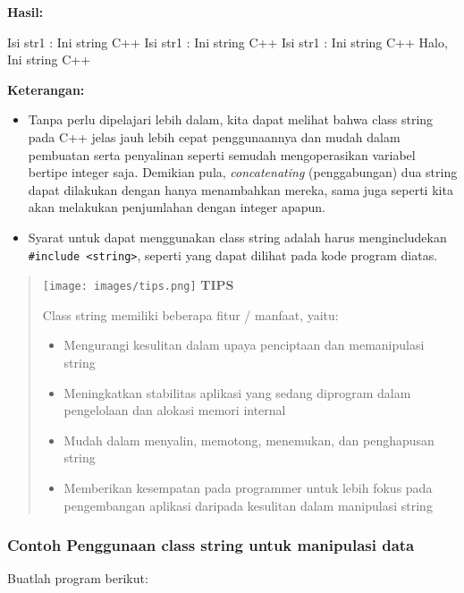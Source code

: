 \textbf{Hasil:}

\begin{lcverbatim}
Isi str1 : Ini string C++
Isi str1 : Ini string C++
Isi str1 : Ini string C++
Halo, Ini string C++
\end{lcverbatim}

\textbf{Keterangan:}

\begin{itemize}

\item
  Tanpa perlu dipelajari lebih dalam, kita dapat melihat bahwa class
  string pada C++ jelas jauh lebih cepat penggunaannya dan mudah dalam
  pembuatan serta penyalinan seperti semudah mengoperasikan variabel
  bertipe integer saja. Demikian pula, \emph{concatenating}
  (penggabungan) dua string dapat dilakukan dengan hanya menambahkan
  mereka, sama juga seperti kita akan melakukan penjumlahan dengan
  integer apapun.
\item
  Syarat untuk dapat menggunakan class string adalah harus
  mengincludekan \texttt{\#include\ \textless{}string\textgreater{}},
  seperti yang dapat dilihat pada kode program diatas.
\end{itemize}
\begin{quotation}
\texttt{[image: images/tips.png]}	 \textbf{TIPS} 
	 
	 Class
	 string memiliki beberapa fitur / manfaat, yaitu: 
\begin{itemize}
	\item Mengurangi kesulitan dalam upaya penciptaan dan
	memanipulasi string
	\item Meningkatkan stabilitas aplikasi
	yang sedang diprogram dalam pengelolaan dan alokasi memori internal
	\item Mudah dalam menyalin, memotong, menemukan, dan
	penghapusan string
	\item Memberikan kesempatan pada
	programmer untuk lebih fokus pada pengembangan aplikasi daripada
	kesulitan dalam manipulasi string
\end{itemize}	 
	 
\end{quotation}


\subsubsection*{Contoh  Penggunaan class string untuk manipulasi data}

Buatlah program berikut:

